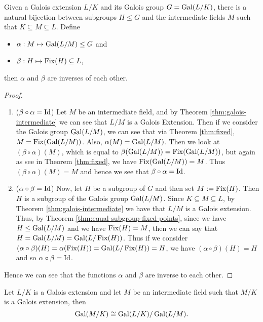 \begin{theorem} \label{thm:fundamental-theorem} Given a Galois extension $L/K$ and its Galois group $G = \operatorname{Gal}(L/K)$, there is a natural bijection between subgroups $H\leq G$ and the intermediate fields $M$ such that $K \subseteq M \subseteq L$. Define

\begin{itemize}
    \item $\alpha:M \mapsto \operatorname{Gal}(L/M) \leq G$ and
    \item $\beta:H \mapsto \operatorname{Fix}(H) \subseteq L$,
\end{itemize}
then $\alpha$ and $\beta$ are inverses of each other.
\end{theorem}
\begin{proof}
\begin{enumerate}[label=(\roman*)]

 \item ($\beta \circ \alpha = \operatorname{Id}$) Let $M$ be an intermediate field, and by Theorem \ref{thm:galois-intermediate} we can see that $L/M$ is a Galois Extension. Then if we consider the Galois group $\operatorname{Gal}(L/M)$, we can see that via Theorem \ref{thm:fixed}, $M = \operatorname{Fix}(\operatorname{Gal}(L/M))$. Also, $\alpha(M) = \operatorname{Gal}(L/M)$. Then we look at $(\beta \circ \alpha)(M)$, which is equal to $\beta(\operatorname{Gal}(L/M)) = \operatorname{Fix}(\operatorname{Gal}(L/M))$, but again as see in Theorem \ref{thm:fixed}, we have $\operatorname{Fix}(\operatorname{Gal}(L/M)) = M$. Thus $(\beta \circ \alpha)(M) = M$ and hence we see that $\beta \circ \alpha = \operatorname{Id}$.

 \item ($\alpha \circ \beta = \operatorname{Id}$) Now, let $H$ be a subgroup of $G$ and then set $M :=\operatorname{Fix}(H)$. Then $H$ is a subgroup of the Galois group $\operatorname{Gal}(L/M)$. Since $K \subseteq M \subseteq L$, by Theorem \ref{thm:galois-intermediate} we have that $L/M$ is a Galois extension. Thus, by Theorem \ref{thm:equal-subgroup-fixed-points}, since we have $H\leq \operatorname{Gal}(L/M)$ and we have $\operatorname{Fix}(H)=M$, then we can say that $H=\operatorname{Gal}(L/M)=\operatorname{Gal}(L/\operatorname{Fix}(H))$. Thus if we consider $(\alpha \circ \beta)(H) = \alpha(\operatorname{Fix}(H)) = \operatorname{Gal}(L/\operatorname{Fix}(H))= H $, we have $(\alpha \circ \beta)(H) = H$ and so $\alpha \circ \beta = \operatorname{Id}$.
\end{enumerate}
Hence we can see that the functions $\alpha$ and $\beta$ are inverse to each other.
\end{proof}



\begin{theorem} \label{thm:correspondence-quotient}
    Let $L / K$ is a Galois extension and let $M$ be an intermediate field such that $M /K$ is a Galois extension, then 
    $$\operatorname{Gal}(M / K) \cong \operatorname{Gal}(L / K) / \operatorname{Gal}(L / M). $$
\end{theorem}

